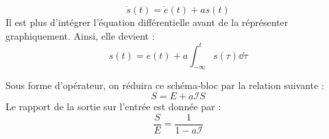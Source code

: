 \[
    \dot{s}(t)=\dot{e}(t)+as(t)
\]
Il est plus d'intégrer l'équation différentielle avant de la réprésenter
graphiquement. Ainsi, elle devient :
\[
    s(t)=e(t)+a\int_{-\infty}^t s(\tau) \dd{\tau}
\]
\begin{center}
    
\end{center}
Sous forme d'opérateur, on réduira ce schéma-bloc par 
la relation suivante :
\[
    S=E+a\mathcal{I}S
\]
Le rapport de la sortie sur l'entrée est donnée par :
\[
    \dfrac{S}{E}=\dfrac{1}{1-a\mathcal{I}}
\]
